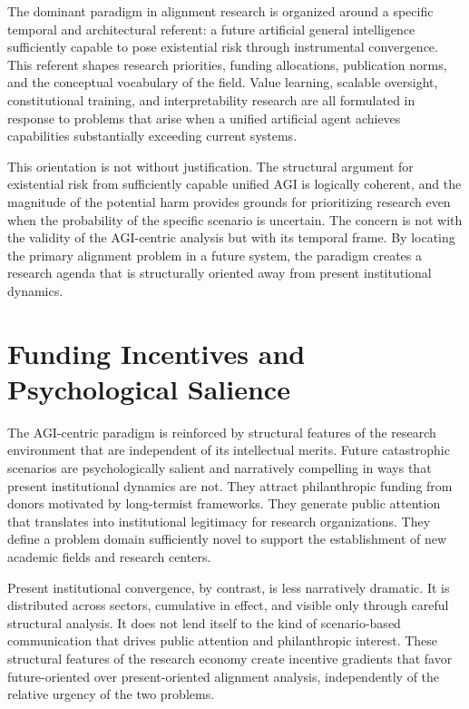 \documentclass[12pt, oneside]{book}
\theoremstyle{plain}
\theoremstyle{definition}
\theoremstyle{remark}
\theoremstyle{definition}
\begin{document}
The dominant paradigm in alignment research is organized around a specific temporal
and architectural referent: a future artificial general intelligence sufficiently
capable to pose existential risk through instrumental convergence. This referent
shapes research priorities, funding allocations, publication norms, and the
conceptual vocabulary of the field. Value learning, scalable oversight, constitutional
training, and interpretability research are all formulated in response to problems
that arise when a unified artificial agent achieves capabilities substantially
exceeding current systems.

This orientation is not without justification. The structural argument for existential
risk from sufficiently capable unified AGI is logically coherent, and the magnitude
of the potential harm provides grounds for prioritizing research even when the
probability of the specific scenario is uncertain. The concern is not with the
validity of the AGI-centric analysis but with its temporal frame. By locating the
primary alignment problem in a future system, the paradigm creates a research agenda
that is structurally oriented away from present institutional dynamics.

\section{Funding Incentives and Psychological Salience}

The AGI-centric paradigm is reinforced by structural features of the research
environment that are independent of its intellectual merits. Future catastrophic
scenarios are psychologically salient and narratively compelling in ways that present
institutional dynamics are not. They attract philanthropic funding from donors
motivated by long-termist frameworks. They generate public attention that translates
into institutional legitimacy for research organizations. They define a problem domain
sufficiently novel to support the establishment of new academic fields and research
centers.

Present institutional convergence, by contrast, is less narratively dramatic. It is
distributed across sectors, cumulative in effect, and visible only through careful
structural analysis. It does not lend itself to the kind of scenario-based
communication that drives public attention and philanthropic interest. These structural
features of the research economy create incentive gradients that favor future-oriented
over present-oriented alignment analysis, independently of the relative urgency of
the two problems.
\end{document}
